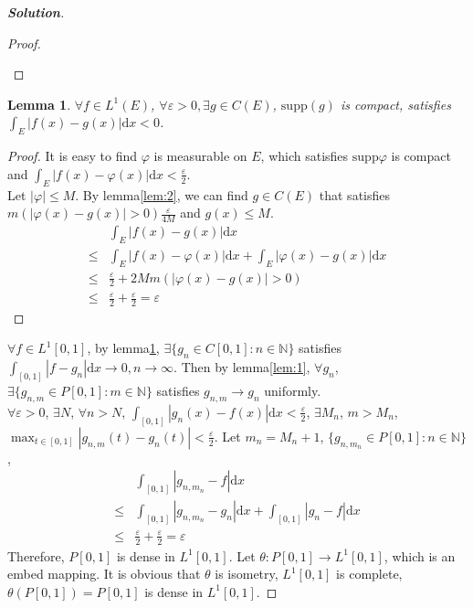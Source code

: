 \documentclass{ctexart}
\newenvironment{solution}{\begin{proof}[\textbf{Solution}]}{\end{proof}}
\renewcommand\phi{\varphi}
\renewcommand{\(}{\left(}
\renewcommand{\)}{\right)}
\renewcommand{\d}{\mathrm{d}}
\newcommand{\supp}{\mathrm{supp}}
\newcommand{\N}{\mathbb{N}}
\renewcommand{\epsilon}{\varepsilon}
\newtheorem{lemma}{Lemma}
\begin{document}
\begin{solution}
\begin{proof}
\begin{itemize}
\end{itemize}
\end{proof}
\begin{lemma}\label{lem:3}
$\forall f \in L^1(E)$, $\forall \epsilon>0, \exists g\in C(E)$, $\supp (g)$ is compact, satisfies \\
$\int_E|f(x)-g(x)|\d x<0$.
\end{lemma}
\begin{proof}
It is easy to find $\phi$ is measurable on $E$, which satisfies $\supp \phi$ is compact and $\int_E |f(x)-\phi(x)|\d x<\frac{\epsilon}{2}$.\\
Let $|\phi|\leq M$. By lemma\ref{lem:2}, we can find $g\in C(E)$ that satisfies $m(|\phi(x)-g(x)|>0)\frac{\epsilon}{4M}$ and $g(x)\leq M$.
\begin{equation}
\begin{aligned}
&\int_E |f(x)-g(x)|\d x\\
\leq&\int_E|f(x)-\phi(x)|\d x+\int_E|\phi(x)-g(x)|\d x\\
\leq &\frac{\epsilon}{2}+2Mm(|\phi(x)-g(x)|>0) \\
\leq &\frac{\epsilon}{2}+\frac{\epsilon}{2}=\epsilon
\end{aligned}
\end{equation}
\end{proof}
$\forall f\in L^1[0,1]$, by lemma\ref{lem:3}, $\exists \{g_n\in C[0,1]: n\in\N\}$ satisfies $\int_{[0,1]}|f-g_n|\d x\to 0, n\to\infty$.
Then by lemma\ref{lem:1}, $\forall g_n$, $\exists \{g_{n,m}\in P[0,1]:m\in\N\}$ satisfies $g_{n,m}\to g_n$ uniformly.\\
$\forall \epsilon>0$, $\exists N$, $\forall n>N$, $\int_{[0,1]}|g_n(x)-f(x)|\d x<\frac{\epsilon}{2}$, $\exists M_n$, $m>M_n$, $\max_{t\in[0,1]}|g_{n,m}(t)-g_n(t)|<\frac{\epsilon}{2}$. Let $m_n=M_n+1$, $\{g_{n,m_n}\in P[0,1]:n\in\N\}$, 
\begin{equation}
\begin{aligned}
&\int_{[0,1]}|g_{n,m_n}-f|\d x \\
\leq&\int_{[0,1]}|g_{n,m_n}-g_n|\d x+\int_{[0,1]}|g_{n}-f|\d x\\
\leq&\frac{\epsilon}{2}+\frac{\epsilon}{2}=\epsilon
\end{aligned}
\end{equation}
Therefore, $P[0,1]$ is dense in $L^1[0,1]$.
Let $\theta: P[0,1]\to L^{1}[0,1]$, which is an embed mapping. It is obvious that $\theta$ is isometry, $L^1[0,1]$ is complete, $\theta(P[0,1])=P[0,1]$ is dense in $L^1[0,1]$.


\end{solution}
\end{document}
